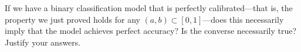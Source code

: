 \item {}
If we have a binary classification model that is perfectly calibrated---that
is, the property we just proved holds for any $(a, b) \subset [0, 1]$---does
this necessarily imply that the model achieves perfect accuracy? Is the
converse necessarily true? Justify your answers.

\ifnum{} {
  
} \fi
